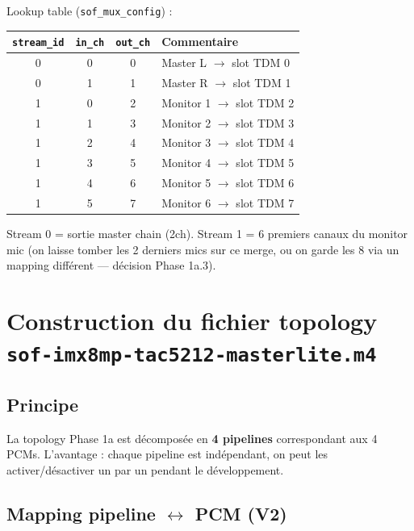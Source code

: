 \documentclass[11pt,a4paper]{article}
\begin{document}
Lookup table (\texttt{sof\_mux\_config}) :
\begin{center}
\begin{tabular}{cccl}
\toprule
\texttt{stream\_id} & \texttt{in\_ch} & \texttt{out\_ch} & Commentaire \\
\midrule
0 & 0 & 0 & Master L $\rightarrow$ slot TDM 0 \\
0 & 1 & 1 & Master R $\rightarrow$ slot TDM 1 \\
1 & 0 & 2 & Monitor 1 $\rightarrow$ slot TDM 2 \\
1 & 1 & 3 & Monitor 2 $\rightarrow$ slot TDM 3 \\
1 & 2 & 4 & Monitor 3 $\rightarrow$ slot TDM 4 \\
1 & 3 & 5 & Monitor 4 $\rightarrow$ slot TDM 5 \\
1 & 4 & 6 & Monitor 5 $\rightarrow$ slot TDM 6 \\
1 & 5 & 7 & Monitor 6 $\rightarrow$ slot TDM 7 \\
\bottomrule
\end{tabular}
\end{center}

Stream 0 = sortie master chain (2ch). Stream 1 = 6 premiers canaux du monitor mic (on laisse tomber les 2 derniers mics sur ce merge, ou on garde les 8 via un mapping différent --- décision Phase 1a.3).

\clearpage
\section{Construction du fichier topology \texttt{sof-imx8mp-tac5212-masterlite.m4}}

\subsection{Principe}
La topology Phase 1a est décomposée en \textbf{4 pipelines} correspondant aux 4 PCMs. L'avantage : chaque pipeline est indépendant, on peut les activer/désactiver un par un pendant le développement.

\subsection{Mapping pipeline $\leftrightarrow$ PCM (V2)}
\end{document}
